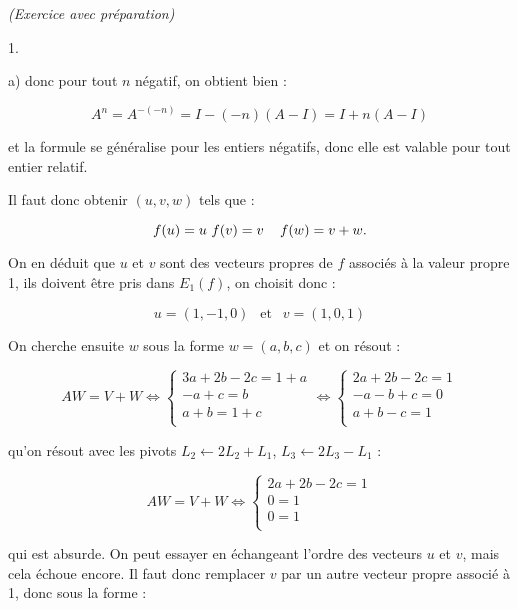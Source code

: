 \documentclass[11pt]{article}%
\begin{document}
\begin{exercice}{\it (Exercice avec préparation)}
\begin{noliste}{1.}
\begin{noliste}{a)}
 donc pour tout $n$ négatif, on obtient bien : 
 
\[
 A^{n} = A^{ - (-n) } = I - (-n) ( A - I ) = I + n ( A - I ) 
\]

 et la formule se généralise pour les entiers négatifs, donc elle est
valable pour tout entier relatif. \\

 \end{noliste}

 \item Il faut donc obtenir $(u,v,w)$ tels que : 
 
\[
 f ( u ) = u \ \, \\
f ( v ) = v \ \, \ \ f ( w ) = v + w. 
\]

 On en déduit que $u$ et $v$ sont des vecteurs propres de $f$ associés
à la valeur propre 1, ils doivent être pris dans $E_{1} (f)$, on
choisit donc : 
 
\[
 u = ( 1, -1, 0 ) \ \ \text{ et } \ \ v = ( 1, 0, 1 ) 
\]

 On cherche ensuite $w$ sous la forme $w = (a,b,c)$ et on résout : 
 
\[
 A W = V + W \Longleftrightarrow \left\{ 
\begin{array}{c}
 3 a + 2 b - 2 c = 1 + a \\
- a + c = b \\
a + b = 1 + c \\
\end{array}
\right. \Longleftrightarrow \left\{ 
\begin{array}{c}
 2 a + 2 b - 2 c = 1 \\
- a - b + c = 0 \\
a + b - c = 1 \\
\end{array}
\right. 
\]

 qu'on résout avec les pivots $L_{2} \leftarrow 2 L_{2} + L_{1}$,
$L_{3} \leftarrow 2 L_{3} - L_{1}$ : 
 
\[
 A W = V + W \Longleftrightarrow \left\{ 
\begin{array}{c}
 2 a + 2 b - 2 c = 1 \\
0 = 1 \\
0 = 1 \\
\end{array}
\right. 
\]

 qui est absurde. On peut essayer en échangeant l'ordre des vecteurs
$u$ et $v$, mais cela échoue encore. Il faut donc remplacer $v$ par un
autre vecteur propre associé à 1, donc sous la forme : 
 

\end{noliste}
\end{exercice}
\end{document}
